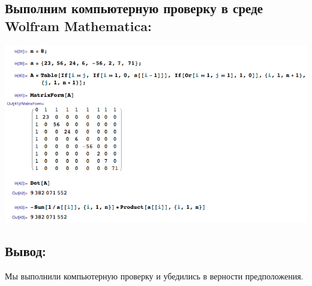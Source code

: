\subsection{Выполним компьютерную проверку в среде Wolfram Mathematica:}
\includegraphics[scale=0.6]{task/1_33/screen.png}
\subsection{Вывод:}
Мы выполнили компьютерную проверку и убедились в верности предположения.
